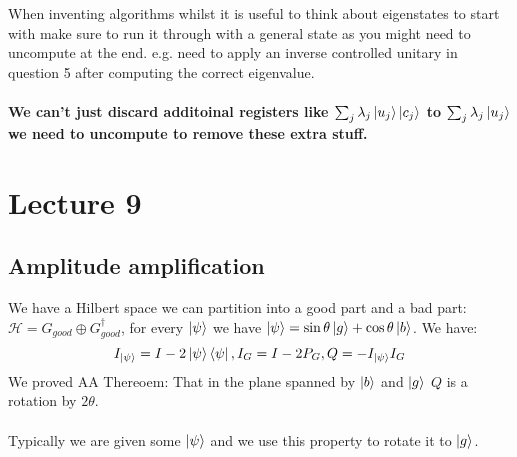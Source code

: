 \documentclass{article}
\begin{document}
{When inventing algorithms whilst it is useful to think about eigenstates to start with make sure to run it through with a general state as you might need to uncompute at the end. e.g. need to apply an inverse controlled unitary in question 5 after computing the correct eigenvalue.\\\\
\textbf{We can't just discard additoinal registers like $\sum_j\lambda_j \ket{u_j} \ket{c_j}$ to $\sum_j \lambda_j \ket{u_j}$ we need to uncompute to remove these extra stuff.}
\section{Lecture 9}
\subsection{Amplitude amplification}
We have a Hilbert space we can partition into a good part and a bad part: $\mathcal{H} = G_{good} \oplus G_{good}^{\dagger}$, for every $\ket{\psi}$ we have $\ket{\psi} = \sin \theta \ket{g} + \cos \theta \ket{b}$. We have:
$$
I_{\ket{\psi}} = I - 2\ket{\psi} \bra{\psi}, I_G = I - 2 P_G, Q = - I_{\ket{\psi}} I_G
$$
We proved AA Thereoem: That in the plane spanned by $\ket{b}$ and $\ket{g}$ $Q$ is a rotation by $2\theta$.\\\\
Typically we are given some $\ket{\psi}$ and we use this property to rotate it to $\ket{g}$.
}
\end{document}
